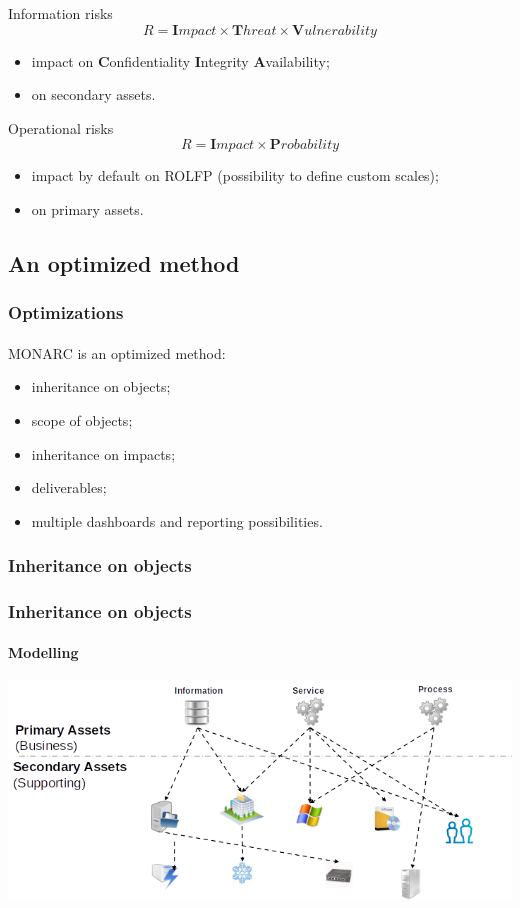 \begin{frame}
  \begin{block}{Information risks}
    $$R = \textbf{I}mpact \times \textbf{T}hreat \times \textbf{V}ulnerability$$
    \begin{itemize}
      \item impact on \textbf{C}onfidentiality \textbf{I}ntegrity \textbf{A}vailability;
      \item on secondary assets.
    \end{itemize}
  \end{block}

  \begin{block}{Operational risks}
    $$R = \textbf{I}mpact \times \textbf{P}robability$$
    \begin{itemize}
      \item impact by default on ROLFP (possibility to define custom scales);
      \item on primary assets.
    \end{itemize}
  \end{block}
\end{frame}



\subsection{An optimized method}
\begin{frame}
  \frametitle{Optimizations}
  \framesubtitle{}
  MONARC is an optimized method:
  \begin{itemize}
    \item inheritance on objects;
    \item scope of objects;
    \item inheritance on impacts;
    \item deliverables;
    \item multiple dashboards and reporting possibilities.
  \end{itemize}
\end{frame}

\subsubsection{Inheritance on objects}
\begin{frame}
  \frametitle{Inheritance on objects}
  \framesubtitle{Modelling}
  \begin{center}
    \includegraphics[scale=0.45]{../common_pictures/MONARC-method-modelling.png}
  \end{center}
\end{frame}

